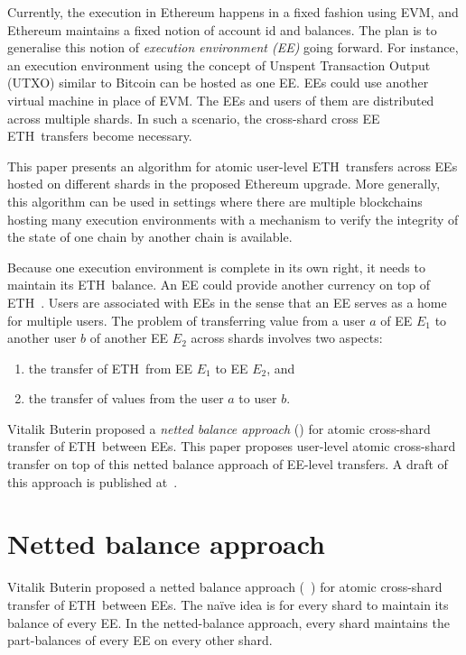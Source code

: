 \documentclass{IEEEtran}
\newcommand{\eth}[0]{ETH~}
\begin{document}
Currently, the execution in Ethereum happens in a fixed fashion using EVM, and Ethereum maintains a fixed notion of account id and balances. The plan is to generalise this notion of {\em execution environment (EE)} going forward. For instance, an execution environment using the concept of Unspent Transaction Output (UTXO) similar to Bitcoin can be hosted as one EE.  EEs could use another virtual machine in place of EVM. The EEs and users of them are distributed across multiple shards. In such a scenario, the cross-shard cross EE \eth transfers become necessary. 

This paper presents an algorithm for atomic user-level \eth transfers across EEs hosted on different shards in the proposed Ethereum upgrade. More generally, this algorithm can be used in settings where there are multiple blockchains hosting many execution environments with a mechanism to verify the integrity of the state of one chain by another chain is available. 

Because one execution environment is complete in its own right, it needs to maintain its \eth balance. An EE could provide another currency on top of \eth. Users are associated with EEs in the sense that an EE serves as a home for multiple users. The problem of transferring value from a user $a$ of EE $E_1$ to another user $b$ of another EE $E_2$ across shards involves two aspects:
\begin{enumerate}
    \item the transfer of \eth from EE $E_1$ to EE $E_2$, and
    \item the transfer of values from the user $a$ to user $b$.
\end{enumerate}

Vitalik Buterin proposed a {\em netted balance approach} (\cite{netted-balance}) for atomic cross-shard transfer of \eth between EEs. This paper proposes user-level atomic cross-shard transfer on top of this netted balance approach of EE-level transfers. A draft of this approach is published at~\cite{ethres-raghavendra}.

\section{Netted balance approach}
\label{sec:netted-balance}
Vitalik Buterin proposed a netted balance approach (~\cite{netted-balance}) for atomic cross-shard transfer of \eth between EEs. The naïve idea is for every shard to maintain its balance of every EE. In the netted-balance approach, every shard maintains the part-balances of every EE on every other shard. 
\end{document}

